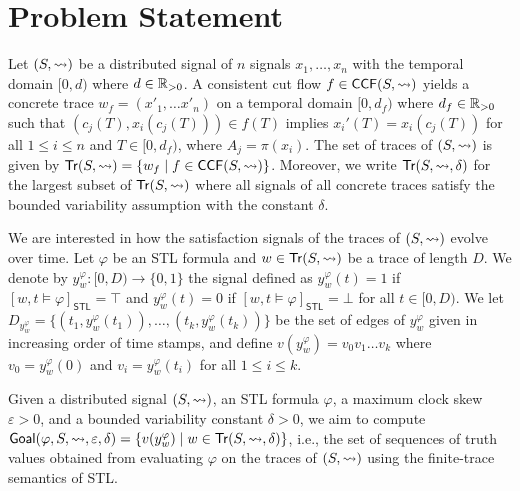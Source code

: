 \section{Problem Statement}
Let $(S,{\rightsquigarrow})$ be a distributed signal of $n$ signals $x_1, \ldots, x_n$ with the temporal domain $[0,d)$ where $d \in \mathbb{R}_{> 0}$.
A consistent cut flow $f \in \mathsf{CCF}(S,{\rightsquigarrow})$ yields a concrete trace $w_f = (x'_1, \ldots x'_n)$ on a temporal domain $[0,d_f)$ where $d_f \in \mathbb{R}_{> 0}$ such that $(c_j(T), x_i(c_j(T))) \in f(T)$ implies $x_i'(T) = x_i(c_j(T))$ for all $1 \leq i \leq n$ and $T \in [0, d_f)$, where $A_j = \pi(x_i)$.
The set of traces of $(S,{\rightsquigarrow})$ is given by $\tr(S,{\hb}) = \{ w_f \st f \in \CCF(S,{\hb})\}$.
Moreover, we write $\mathsf{Tr}(S,{\rightsquigarrow},\delta)$ for the largest subset of $\mathsf{Tr}(S,{\rightsquigarrow})$ where all signals of all concrete traces satisfy the bounded variability assumption with the constant $\delta$. 

We are interested in how the satisfaction signals of the traces of $(S,{\rightsquigarrow})$ evolve over time.
Let $\varphi$ be an STL formula and $w \in \mathsf{Tr}(S,{\rightsquigarrow})$ be a trace of length $D$.
We denote by $y_w^\varphi : [0,D) \to \{0,1\}$ the signal defined as $y_w^\varphi(t) = 1$ if $[w, t \models \varphi]_{\mathsf{STL}} = \top$ and $y_w^\varphi(t) = 0$ if $[w, t \models \varphi]_{\mathsf{STL}} = \bot$ for all $t\in [0,D)$.
We let $D_{y_w^\varphi} = \{ (t_1, y_w^\varphi(t_1)), \ldots, (t_k, y_w^\varphi(t_k)) \}$ be the set of edges of $y_w^\varphi$ given in increasing order of time stamps, and define $v(y_w^\varphi) = v_0 v_1 \ldots v_k$ where $v_0 = y_w^\varphi(0)$ and $v_i = y_w^\varphi(t_i)$ for all $1 \leq i \leq k$.


Given a distributed signal $(S, {\rightsquigarrow})$, an STL formula $\varphi$, a maximum clock skew $\varepsilon > 0$, and a bounded variability constant $\delta > 0$, we aim to compute $\mathsf{Goal}(\varphi, S, {\hb}, \varepsilon, \delta) = \{ v(y_w^\varphi) \st w \in \tr(S, {\hb}, \delta) \}$, i.e., the set of sequences of truth values obtained from evaluating $\varphi$ on the traces of $(S, {\rightsquigarrow})$ using the finite-trace semantics of STL.